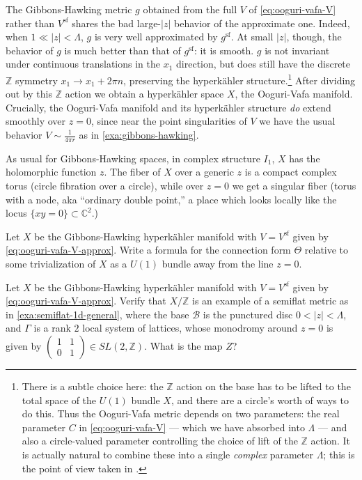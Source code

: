 \documentclass[12pt,letterpaper,reqno]{article}
\numberwithin{equation}{section}
\newcommand{\cB}{\ensuremath{\mathcal B}}
\newcommand{\C}{\ensuremath{\mathbb C}}
\newcommand{\Z}{\ensuremath{\mathbb Z}}
\newcommand{\hk}{hyperk\"ahler\xspace}
\renewcommand{\sf}{\mathrm{sf}}
\newcommand{\abs}[1]{\lvert#1\rvert}
\newcommand{\ti}[1]{\textit{#1}}
\newcommand{\insfig}[2]{

\medskip
\noindent
\begin{minipage}{\linewidth}

\makebox[\linewidth]{\texttt{[image: figures/\#1-crop.pdf]}}

\end{minipage}
\medskip

}
\begin{document}
\begin{example}
The Gibbons-Hawking metric $g$ obtained from the full $V$
of \eqref{eq:ooguri-vafa-V} rather than $V^\sf$
shares the bad large-$\abs{z}$ behavior
of the approximate one. Indeed, when $1 \ll \abs{z} < \Lambda$,
$g$ is very well approximated by $g^\sf$.
At small $\abs{z}$, though, the behavior of $g$ is much better than that
of $g^\sf$: it is smooth.
$g$ is not invariant under continuous translations in
the $x_1$ direction, but does still have the discrete $\Z$
symmetry $x_1 \to x_1 + 2 \pi n$, preserving
the \hk structure.\footnote{There is a subtle choice here:
the $\Z$ action on the base has to be lifted to the total space
of the $U(1)$ bundle $X$, and there are a circle's worth of ways
to do this. Thus the Ooguri-Vafa metric depends on two parameters:
the real parameter $C$ in \eqref{eq:ooguri-vafa-V} --- which we have
absorbed into $\Lambda$ --- and also a circle-valued
parameter controlling the choice of lift of the $\Z$ action. It is actually natural to combine
these into a single \ti{complex} parameter $\Lambda$; this is the
point of view taken in \cite{Gaiotto:2008cd}.}
After dividing out by this $\Z$ action we obtain a \hk
space $X$, the Ooguri-Vafa manifold. Crucially, the Ooguri-Vafa
manifold and its \hk structure \ti{do} extend smoothly over $z=0$, since near
the point singularities of $V$ we have the usual behavior
$V \sim \frac{1}{4 \pi r}$ as in \autoref{exa:gibbons-hawking}.

As usual for Gibbons-Hawking spaces,
in complex structure $I_1$, $X$ has the holomorphic function $z$.
The fiber of $X$ over a generic $z$ is a compact complex torus (circle
fibration over a circle), while over $z=0$ we get a singular
fiber (torus with a node, aka ``ordinary double point,'' a place
which looks locally like the locus $\{xy=0\} \subset \C^2$.)

\end{example}

\insfig{higgs-bundles-8}{0.92}

\begin{exercise} Let $X$ be the Gibbons-Hawking
\hk manifold with $V = V^\sf$ given by \eqref{eq:ooguri-vafa-V-approx}.
Write a formula for the connection form $\Theta$ relative to
some trivialization of $X$ as a $U(1)$ bundle away from the
line $z = 0$.
\end{exercise}

\begin{exercise} \label{exc:ooguri-vafa-semiflat} Let $X$ be the Gibbons-Hawking
\hk manifold with $V = V^\sf$ given by \eqref{eq:ooguri-vafa-V-approx}.
Verify that $X / \Z$ is an example of a semiflat metric as in
\autoref{exa:semiflat-1d-general}, where the base $\cB$ is the
punctured disc $0 < \abs{z} < \Lambda$, and $\Gamma$ is a rank $2$
local system of lattices, whose monodromy around $z=0$
is given by
$\begin{pmatrix} 1 & 1 \\ 0 & 1 \end{pmatrix} \in SL(2,\Z)$.
What is the map $Z$?
\end{exercise}
\end{document}
